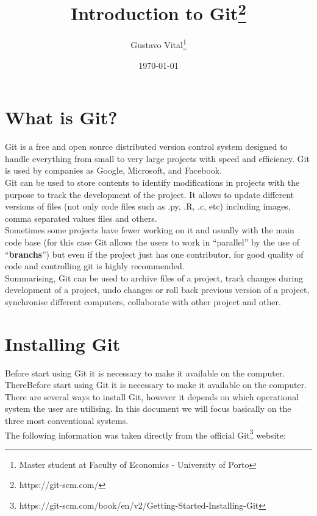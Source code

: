 \documentclass{article}
\title{Introduction to Git\footnote{https://git-scm.com/}}
\author{Gustavo Vital\thanks{Master student at Faculty of Economics - University of Porto}}
\date{\today}
\begin{document}
\maketitle

\tableofcontents

\section{What is Git?}

Git is a free and open source distributed version control system designed to handle everything from small to very large projects with speed and efficiency. Git is used by companies as Google, Microsoft, and Facebook.\\

Git can be used to store contents to identify modifications in projects with the purpose to track the development of the project. It allows to update different versions of files (not only code files such as .py, .R, .c, etc) including images, comma separated values files and others.\\

Sometimes some projects have fewer working on it and usually with the main code base (for this case Git allows the users to work in ``parallel'' by the use of ``\textbf{branchs}'') but even if the project just has one contributor, for good quality of code and controlling git is highly recommended.\\ 

Summarising, Git can be used to archive files of a project, track changes during development of a project, undo changes or roll back previous version of a project, synchronise different computers, collaborate with other project and other. 

\section{Installing Git}

Before start using Git it is necessary to make it available on the computer. ThereBefore start using Git it is necessary to make it available on the computer. There are several ways to install Git, however it depends on which operational system the user are utilising. In this document we will focus basically on the three most conventional systems.\\

The following information was taken directly from the official Git\footnote{https://git-scm.com/book/en/v2/Getting-Started-Installing-Git} website:
\end{document}
